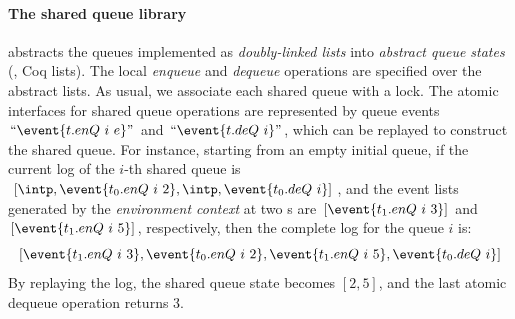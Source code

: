 \vspace*{-10pt}
\paragraph{The shared queue library}
\label{sec:base:procm}
abstracts the queues implemented as \emph{doubly-linked lists} into
\emph{abstract queue states} (\ie, Coq lists).  The local {\it
  enqueue} and {\it dequeue} operations are specified over the
abstract lists.  As usual, we associate each shared queue with a lock.
The atomic interfaces for shared queue operations are represented by
queue events $``\event{t.enQ\ i\ e}"$ and $``\event{t.deQ\ i}"$, which
can be replayed to construct the shared queue.  
For instance, starting
from an empty initial queue, if the current log of the $i$-th
shared queue is
$[\intp,\event{t_0.enQ\ i\ 2},\intp,\event{t_0.deQ\ i}]$, and the
event lists generated by the \emph{environment context} at two
{\intptext}s are $[\event{t_1.enQ\ i\ 3}]$ and
$[\event{t_1.enQ\ i\ 5}]$, respectively, then the complete log
for the queue $i$ is:
\[[\event{t_1.enQ\  i\ 3},\event{t_0.enQ\  i\ 2},\event{t_1.enQ\  i\ 5},\event{t_0.deQ\ i}]\]%
By replaying the log, the shared queue state becomes $[2,5]$,
and the last atomic dequeue operation returns 3.

